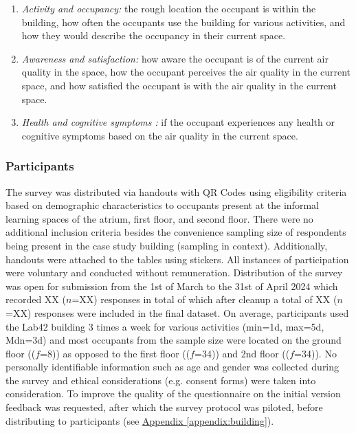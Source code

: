 \begin{enumerate}
  \item \textit{Activity and occupancy:} the rough location the occupant is within the building, how often the occupants use the building for various activities, and how they would describe the occupancy in their current space.
  \item \textit{Awareness and satisfaction:} how aware the occupant is of the current air quality in the space, how the occupant perceives the air quality in the current space, and how satisfied the occupant is with the air quality in the current space.
  \item \textit{Health and cognitive symptoms :} if the occupant experiences any health or cognitive symptoms based on the air quality in the current space.
\end{enumerate}


\subsubsection{Participants}
The survey was distributed via handouts with QR Codes using eligibility criteria based on demographic characteristics to occupants present at the informal learning spaces of the atrium, first floor, and second floor. There were no additional inclusion criteria besides the convenience sampling size of respondents being present in the case study building (sampling in context). Additionally, handouts were attached to the tables using stickers. All instances of participation were voluntary and conducted without remuneration. Distribution of the survey was open for submission from the 1st of March to the 31st of April 2024 which recorded XX ($n$=XX) responses in total of which after cleanup a total of XX ($n$=XX) responses were included in the final dataset. On average, participants used the Lab42 building 3 times a week for various activities (min=1d, max=5d, Mdn=3d) and most occupants from the sample size were located on the ground floor (($f$=8)) as opposed to the first floor (($f$=34)) and 2nd floor (($f$=34)). No personally identifiable information such as age and gender was collected during the survey and ethical considerations (e.g. consent forms) were taken into consideration. To improve the quality of the questionnaire on the initial version feedback was requested, after which the survey protocol was piloted, before distributing to participants (see \hyperref[appendix:building]{Appendix \ref*{appendix:building}}). 

